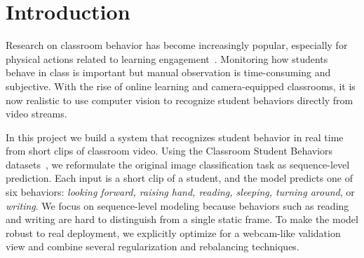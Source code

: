 \documentclass[conference]{IEEEtran}
\begin{document}
\begin{abstract}
Recent classroom analytics increasingly rely on computer vision to understand student behavior automatically. We develop a video-based system for real-time recognition of individual student behaviors in classroom settings. Building on the Classroom Student Behaviors datasets~\cite{csb,csb2}, we reformulate the task from single-frame classification to sequence-level prediction and train a temporal convolutional network based on ConvNeXt. Our model takes short clips of student video as input and predicts one of six behaviors: \textit{looking forward, raising hand, reading, sleeping, turning around}, or \textit{writing}. To improve robustness, we use strong spatial data augmentation, a ``webcam-style'' validation pipeline, class-imbalance-aware sampling and loss weighting, and both global Mixup and a local CutMix strategy focused on the hand and desk region. On a held-out test set, the model reaches 96\% sequence-level accuracy and a macro-averaged F1 score of 0.96, with almost perfect recall for fine-grained behaviors such as writing. These results suggest that temporal ConvNeXt models with deployment-oriented training can provide reliable behavior predictions for real-time classroom tools.
\end{abstract}

\section{Introduction}

Research on classroom behavior has become increasingly popular, especially for physical actions related to learning engagement~\cite{liu2025classroomreview}. Monitoring how students behave in class is important but manual observation is time-consuming and subjective. With the rise of online learning and camera-equipped classrooms, it is now realistic to use computer vision to recognize student behaviors directly from video streams.

In this project we build a system that recognizes student behavior in real time from short clips of classroom video. Using the Classroom Student Behaviors datasets~\cite{csb,csb2}, we reformulate the original image classification task as sequence-level prediction. Each input is a short clip of a student, and the model predicts one of six behaviors: \textit{looking forward, raising hand, reading, sleeping, turning around}, or \textit{writing}. We focus on sequence-level modeling because behaviors such as reading and writing are hard to distinguish from a single static frame. To make the model robust to real deployment, we explicitly optimize for a webcam-like validation view and combine several regularization and rebalancing techniques.
\end{document}
